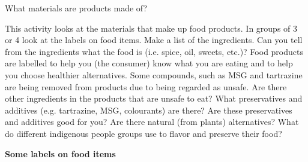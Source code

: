    \label{m38708*eip-344}\begin{activity}{What materials are products made of?}
{
\begin{minipage}{.6\textwidth}
This activity looks at the materials that make up food products. In groups of 3 or 4 look at the labels on food items. Make a list of the ingredients. Can you tell from the ingredients what the food is (i.e. spice, oil, sweets, etc.)? Food products are labelled to help you (the consumer) know what you are eating and to help you choose healthier alternatives. Some compounds, such as MSG and tartrazine are being removed from products due to being regarded as unsafe. Are there other ingredients in the products that are unsafe to eat? What preservatives and additives (e.g. tartrazine, MSG, colourants) are there? Are these preservatives and additives good for you? Are there natural (from plants) alternatives? What do different indigenous people groups use to flavor and preserve their food? 
\end{minipage}
\begin{minipage}{.3\textwidth}
 \begin{center}
\textbf{Some labels on food items}\\

\end{center}
\end{minipage}}
\end{activity}
